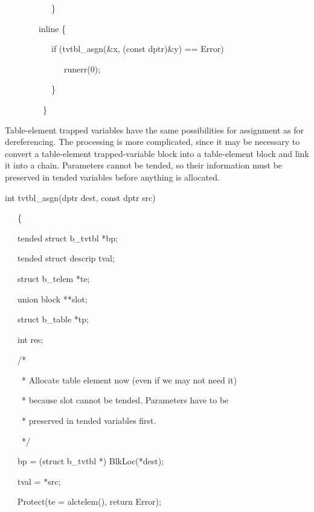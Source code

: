 {\ttfamily\mdseries
\ \ \ \ \ \ \ \ \ \ \ \}}

{\ttfamily\mdseries
\ \ \ \ \ \ \ \ inline \{}

{\ttfamily\mdseries
\ \ \ \ \ \ \ \ \ \ \ if (tvtbl\_asgn(\&x, (const dptr)\&y) == Error)}

{\ttfamily\mdseries
\ \ \ \ \ \ \ \ \ \ \ \ \ \ runerr(0);}

{\ttfamily\mdseries
\ \ \ \ \ \ \ \ \ \ \ \}}

{\ttfamily\mdseries
\ \ \ \ \ \ \ \ \ \}}


Table-element trapped variables have the same possibilities for
assignment as for dereferencing. The processing is more complicated,
since it may be necessary to convert a table-element trapped-variable
block into a table-element block and link it into a chain. Parameters
cannot be tended, so their information must be preserved in tended
variables before anything is allocated.

{\ttfamily\mdseries
int tvtbl\_asgn(dptr dest, const dptr src)}

{\ttfamily\mdseries
\ \ \ \{}

{\ttfamily\mdseries
\ \ \ tended struct b\_tvtbl *bp;}

{\ttfamily\mdseries
\ \ \ tended struct descrip tval;}

{\ttfamily\mdseries
\ \ \ struct b\_telem *te;}

{\ttfamily\mdseries
\ \ \ union block **slot;}

{\ttfamily\mdseries
\ \ \ struct b\_table *tp;}

{\ttfamily\mdseries
\ \ \ int res;}


\bigskip

{\ttfamily\mdseries
\ \ \ /*}

{\ttfamily\mdseries
\ \ \ \ * Allocate table element now (even if we may not need it)}

{\ttfamily\mdseries
\ \ \ \ * because slot cannot be tended. Parameters have to be}

{\ttfamily\mdseries
\ \ \ \ * preserved in tended variables first.}

{\ttfamily\mdseries
\ \ \ \ */}

{\ttfamily\mdseries
\ \ \ bp = (struct b\_tvtbl *) BlkLoc(*dest);}

{\ttfamily\mdseries
\ \ \ tval = *src;}

{\ttfamily\mdseries
\ \ \ Protect(te = alctelem(), return Error);}


\bigskip

